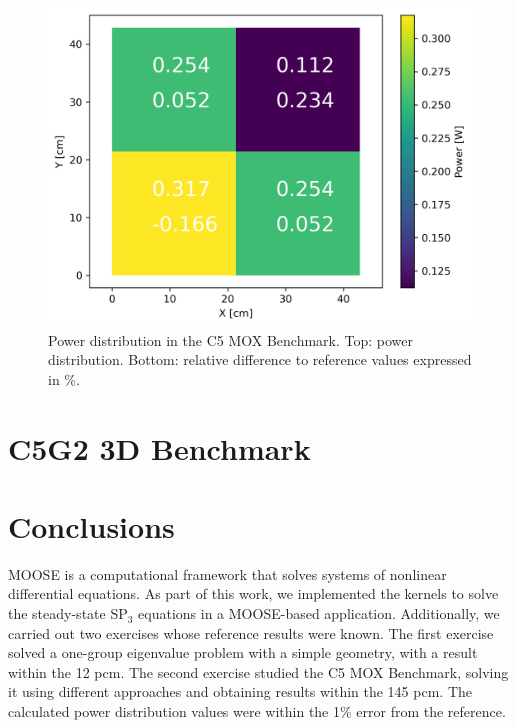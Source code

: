 \documentclass{anstrans}
\begin{document}
\begin{figure}[htbp!] %
    \centering
    \includegraphics[width=0.95\linewidth]{figures/distrib.png}
    \hfill
    \caption{Power distribution in the C5 MOX Benchmark. Top: power distribution. Bottom: relative difference to reference values expressed in \%.}
    \label{fig:power-distrib}
\end{figure}


\section{C5G2 3D Benchmark}

\cite{lewis_benchmark_2001}

\cite{ryu_finite_2013}








\section{Conclusions}

MOOSE is a computational framework that solves systems of nonlinear differential equations.
As part of this work, we implemented the kernels to solve the steady-state SP$_3$ equations in a MOOSE-based application.
Additionally, we carried out two exercises whose reference results were known.
The first exercise solved a one-group eigenvalue problem with a simple geometry, with a result within the 12 pcm.
The second exercise studied the C5 MOX Benchmark, solving it using different approaches and obtaining results within the 145 pcm.
The calculated power distribution values were within the 1\% error from the reference.
\end{document}

